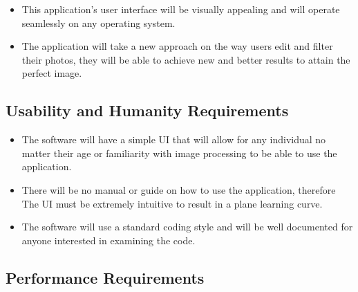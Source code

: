\documentclass[12pt, titlepage]{article}
\begin{document}
\begin{itemize}
\item This application's user interface will be visually appealing and will operate seamlessly on any operating system.
\item The application will take a new approach on the way users edit and filter their photos, they will be able to achieve new and better results to attain the perfect image. 
\end{itemize}

\subsection{Usability and Humanity Requirements}

\begin{itemize}
\item The software will have a simple UI that will allow for any individual no matter their age or familiarity with image processing to be able to use the application.
\item There will be no manual or guide on how to use the application, therefore The UI must be extremely intuitive to result in a plane learning curve.
\item The software will use a standard coding style and will be well documented for anyone interested in examining the code.
\end{itemize}

\subsection{Performance Requirements}
\end{document}
